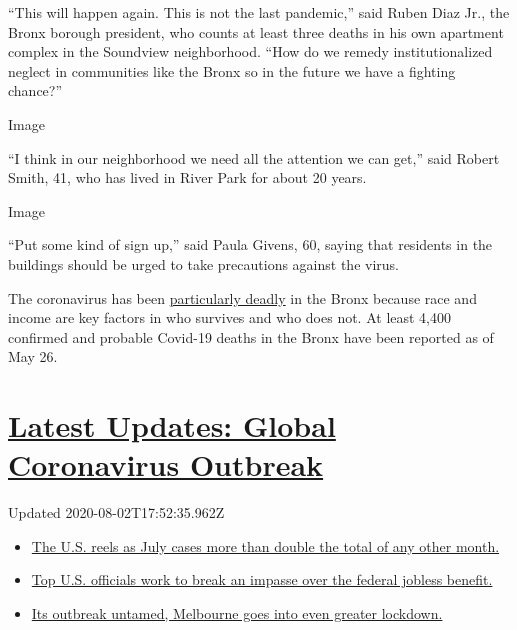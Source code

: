 ``This will happen again. This is not the last pandemic,'' said Ruben
Diaz Jr., the Bronx borough president, who counts at least three deaths
in his own apartment complex in the Soundview neighborhood. ``How do we
remedy institutionalized neglect in communities like the Bronx so in the
future we have a fighting chance?''

Image

``I think in our neighborhood we need all the attention we can get,''
said Robert Smith, 41, who has lived in River Park for about 20 years.

Image

``Put some kind of sign up,'' said Paula Givens, 60, saying that
residents in the buildings should be urged to take precautions against
the virus.

The coronavirus has been
\href{https://www1.nyc.gov/site/doh/covid/covid-19-data.page}{particularly
deadly} in the Bronx because race and income are key factors in who
survives and who does not. At least 4,400 confirmed and probable
Covid-19 deaths in the Bronx have been reported as of May 26.

\hypertarget{latest-updates-global-coronavirus-outbreak}{%
\section{\texorpdfstring{\href{https://www.nytimes.com/2020/08/01/world/coronavirus-covid-19.html?action=click\&pgtype=Article\&state=default\&region=MAIN_CONTENT_1\&context=storylines_live_updates}{Latest
Updates: Global Coronavirus
Outbreak}}{Latest Updates: Global Coronavirus Outbreak}}\label{latest-updates-global-coronavirus-outbreak}}

Updated 2020-08-02T17:52:35.962Z

\begin{itemize}
\tightlist
\item
  \href{https://www.nytimes.com/2020/08/01/world/coronavirus-covid-19.html?action=click\&pgtype=Article\&state=default\&region=MAIN_CONTENT_1\&context=storylines_live_updates\#link-34047410}{The
  U.S. reels as July cases more than double the total of any other
  month.}
\item
  \href{https://www.nytimes.com/2020/08/01/world/coronavirus-covid-19.html?action=click\&pgtype=Article\&state=default\&region=MAIN_CONTENT_1\&context=storylines_live_updates\#link-780ec966}{Top
  U.S. officials work to break an impasse over the federal jobless
  benefit.}
\item
  \href{https://www.nytimes.com/2020/08/01/world/coronavirus-covid-19.html?action=click\&pgtype=Article\&state=default\&region=MAIN_CONTENT_1\&context=storylines_live_updates\#link-2bc8948}{Its
  outbreak untamed, Melbourne goes into even greater lockdown.}
\end{itemize}

